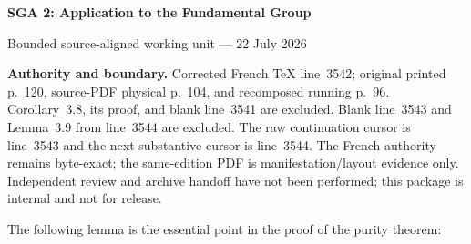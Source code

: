\documentclass[10pt,a4paper]{article}
\begin{document}
\begin{center}
  {\Large\bfseries SGA 2: Application to the Fundamental Group}\par\smallskip
  {\large Bounded source-aligned working unit --- 22 July 2026}
\end{center}

\noindent\colorbox{softgray}{\parbox{0.95\linewidth}{\footnotesize\textbf{Authority and boundary.}
Corrected French TeX line~3542; original printed p.~120,
source-PDF physical p.~104, and recomposed running p.~96. Corollary~3.8,
its proof, and blank line~3541 are excluded. Blank line~3543 and Lemma~3.9
from line~3544 are excluded. The raw continuation cursor is line~3543 and
the next substantive cursor is line~3544. The French authority remains
byte-exact; the same-edition PDF is manifestation/layout evidence only.
Independent review and archive handoff have not been performed; this package
is internal and not for release.}}

\medskip
\noindent The following lemma is the essential point in the proof of the purity theorem:
\end{document}
